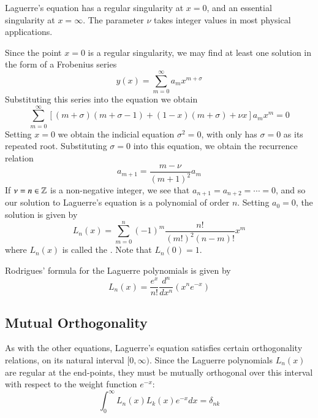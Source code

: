 \documentclass[12pt, a4paper, oneside, openright, titlepage]{book}
\begin{document}
Laguerre's equation has a regular singularity at $x = 0$, and an essential singularity at $x = \infty$. The parameter $\nu$ takes integer values in most physical applications.

Since the point $x = 0$ is a regular singularity, we may find at least one solution in the form of a Frobenius series \begin{equation}
    y(x) = \sum_{m=0}^{\infty}a_mx^{m+\sigma}
\end{equation}
Substituting this series into the equation we obtain \begin{equation*}
    \sum_{m=0}^{\infty}[(m+\sigma)(m+\sigma-1)+(1-x)(m+\sigma)+\nu x]a_mx^m = 0
\end{equation*}
Setting $x = 0$ we obtain the indicial equation $\sigma^2 = 0$, with only has $\sigma = 0$ as its repeated root. Substituting $\sigma = 0$ into this equation, we obtain the recurrence relation \begin{equation*}
    a_{m+1} = \frac{m-\nu}{(m+1)^2}a_m
\end{equation*}
If $\nu = n \in \mathbb Z$ is a non-negative integer, we see that $a_{n+1} = a_{n+2} = \cdots = 0$, and so our solution to Laguerre's equation is a polynomial of order $n$. Setting $a_0 = 0$, the solution is given by \begin{equation}
    L_n(x) = \sum_{m=0}^n(-1)^m\frac{n!}{(m!)^2(n-m)!}x^m
\end{equation}
where $L_n(x)$ is called the . Note that $L_n(0) = 1$.

\begin{thm}
    Rodrigues' formula for the Laguerre polynomials is given by \begin{equation}
        L_n(x) = \frac{e^x}{n!}\frac{d^n}{dx^n}(x^ne^{-x})
    \end{equation}
\end{thm}

\subsection{Mutual Orthogonality}

As with the other equations, Laguerre's equation satisfies certain orthogonality relations, on its natural interval $[0,\infty)$. Since the Laguerre polynomials $L_n(x)$ are regular at the end-points, they must be mutually orthogonal over this interval with respect to the weight function $e^{-x}$: \begin{equation*}
    \int_{0}^{\infty}L_n(x)L_k(x)e^{-x}dx = \delta_{nk}
\end{equation*}
\end{document}
